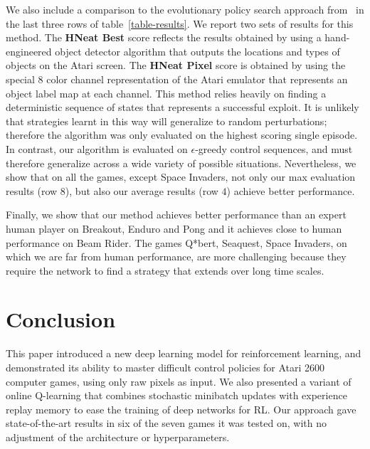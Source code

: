\documentclass{article} \usepackage{nips13submit_e,times}
\begin{document}
We also include a comparison to the evolutionary policy search approach from~\cite{hausknecht-neuro} in the last three rows of table~\ref{table-results}.   
We report two sets of results for this method. The \textbf{HNeat Best} score reflects the results obtained by using a hand-engineered object detector algorithm that outputs the locations and types of objects on the Atari screen. The \textbf{HNeat Pixel} score is obtained by using the special 8 color channel representation of the Atari emulator that represents an object label map at each channel. 
This method relies heavily on finding a deterministic sequence of states that represents a successful exploit. It is unlikely that strategies learnt in this way will generalize to random perturbations; therefore the algorithm was only evaluated on the highest scoring single episode. In contrast, our algorithm is evaluated on $\epsilon$-greedy control sequences, and must therefore generalize across a wide variety of possible situations.  Nevertheless, we show that on all the games, except Space Invaders, not only our max evaluation results (row $8$), but also our average results (row $4$) achieve better performance.


Finally, we show that our method achieves better performance than an expert human player on Breakout, Enduro and Pong and it achieves close to human performance on Beam Rider. The games Q*bert, Seaquest, Space Invaders, on which we are far from human performance, are more challenging because they require the network to find a strategy that extends over long time scales.  
 
\vspace{-0.3cm}
\section{Conclusion}
\vspace{-0.2cm}
\label{sec:conclusion}
This paper introduced a new deep learning model for reinforcement learning, and demonstrated its ability to master difficult control policies for Atari 2600 computer games, using only raw pixels as input.
We also presented a variant of online Q-learning that combines stochastic minibatch updates with experience replay memory to ease the training of deep networks for RL.
Our approach gave state-of-the-art results in six of the seven games it was tested on, with no adjustment of the architecture or hyperparameters.


 







\end{document}
